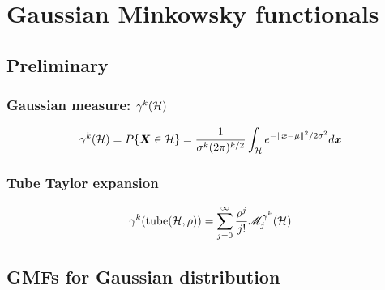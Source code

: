 \documentclass[a4paper,12pt]{article}
\begin{document}
\section{Gaussian Minkowsky functionals}
\subsection{Preliminary}
\subsubsection{Gaussian measure: $\gamma^k(\mathcal{H})$}
\begin{equation}
  \gamma^k(\mathcal{H}) = P\{\boldsymbol{X}\in\mathcal{H}\}=\frac{1}{\sigma^k(2\pi)^{k/2}} \int_{\mathcal{H}} e^{-\|\boldsymbol{x}-\mu\|^2/2\sigma^2} d\boldsymbol{x}
\end{equation}
\subsubsection{Tube Taylor expansion}
\begin{equation}
  \gamma^k(\text{tube}(\mathcal{H},\rho))=\sum_{j=0}^{\infty} \frac{\rho^j}{j!}\mathscr{M}^{\gamma^k}_j(\mathcal{H})
\end{equation}

\subsection{GMFs for Gaussian distribution}
\end{document}
